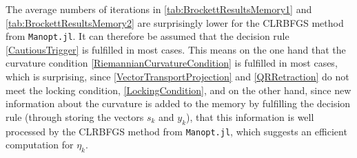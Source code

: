 The average numbers of iterations in \cref{tab:BrockettResultsMemory1} and \cref{tab:BrockettResultsMemory2} are surprisingly lower for the CLRBFGS method from \lstinline!Manopt.jl!. It can therefore be assumed that the decision rule \cref{CautiousTrigger} is fulfilled in most cases. This means on the one hand that the curvature condition \cref{RiemannianCurvatureCondition} is fulfilled in most cases, which is surprising, since \cref{VectorTransportProjection} and \cref{QRRetraction} do not meet the locking condition, \cref{LockingCondition}, and on the other hand, since new information about the curvature is added to the memory by fulfilling the decision rule (through storing the vectors $s_k$ and $y_k$), that this information is well processed by the CLRBFGS method from \lstinline!Manopt.jl!, which suggests an efficient computation for $\eta_k$. \\

\begin{table}[H]\label{tab:BrockettResultsLargeDimensions}
    \caption{Comparison of CLRBFGS from \lstinline!Manopt.jl! with LRBFGS from \cite{HuangGallivanAbsil:2015} on $St(k,1000)$ for $k = 2, 3, 4, 5$.}
\end{table}

